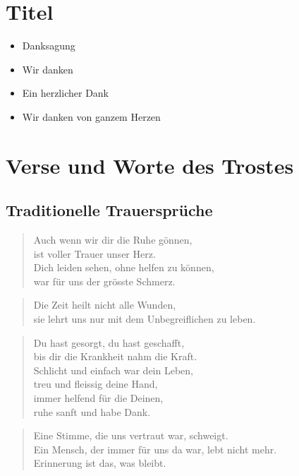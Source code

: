 \documentclass[ngerman,a4paper,11pt]{scrreprt}
\begin{document}
\clearpage

\section{Titel}
\label{sec-2-1-1}

\begin{itemize}
\item Danksagung
\item Wir danken
\item Ein herzlicher Dank
\item Wir danken von ganzem Herzen
\end{itemize}

\section{Verse und Worte des Trostes}
\label{sec-2-1-2}

\subsection{Traditionelle Trauersprüche}
\label{sec-2-1-2-1}

\begin{verse}
Auch wenn wir dir die Ruhe gönnen, \\
ist voller Trauer unser Herz. \\
Dich leiden sehen, ohne helfen zu können, \\
war für uns der grösste Schmerz. \\
\end{verse}

\begin{verse}
Die Zeit heilt nicht alle Wunden, \\
sie lehrt uns nur mit dem Unbegreiflichen zu leben. \\
\end{verse}

\begin{verse}
Du hast gesorgt, du hast geschafft, \\
bis dir die Krankheit nahm die Kraft. \\
Schlicht und einfach war dein Leben, \\
treu und fleissig deine Hand, \\
immer helfend für die Deinen, \\
ruhe sanft und habe Dank. \\
\end{verse}

\begin{verse}
Eine Stimme, die uns vertraut war, schweigt. \\
Ein Mensch, der immer für uns da war, lebt nicht mehr. \\
Erinnerung ist das, was bleibt. \\
\end{verse}
\end{document}
